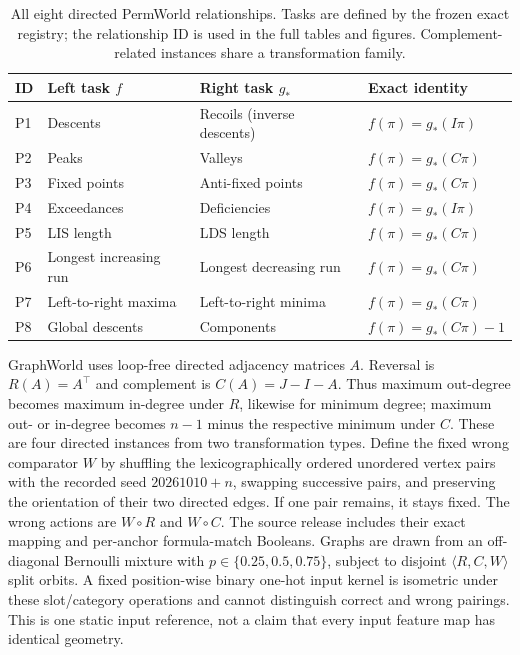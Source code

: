 \documentclass[10pt]{article}
\begin{document}
\begin{table}[h]
\centering\small
\begin{tabular}{llll}
\toprule
ID & Left task $f$ & Right task $g_*$ & Exact identity\\
\midrule
P1 & Descents & Recoils (inverse descents) & $f(\pi)=g_*(I\pi)$\\
P2 & Peaks & Valleys & $f(\pi)=g_*(C\pi)$\\
P3 & Fixed points & Anti-fixed points & $f(\pi)=g_*(C\pi)$\\
P4 & Exceedances & Deficiencies & $f(\pi)=g_*(I\pi)$\\
P5 & LIS length & LDS length & $f(\pi)=g_*(C\pi)$\\
P6 & Longest increasing run & Longest decreasing run & $f(\pi)=g_*(C\pi)$\\
P7 & Left-to-right maxima & Left-to-right minima & $f(\pi)=g_*(C\pi)$\\
P8 & Global descents & Components & $f(\pi)=g_*(C\pi)-1$\\
\bottomrule
\end{tabular}
\caption{All eight directed PermWorld relationships. Tasks are defined by
the frozen exact registry; the relationship ID is used in the full tables
and figures. Complement-related instances share a transformation family.}
\label{tab:relations}
\end{table}

GraphWorld uses loop-free directed adjacency matrices $A$. Reversal is
$R(A)=A^\top$ and complement is $C(A)=J-I-A$. Thus maximum out-degree
becomes maximum in-degree under $R$, likewise for minimum degree; maximum
out- or in-degree becomes $n-1$ minus the respective minimum under $C$.
These are four directed instances from two transformation types. Define the
fixed wrong comparator $W$ by shuffling the lexicographically ordered
unordered vertex pairs with the recorded seed $20261010+n$, swapping
successive pairs, and preserving the orientation of their two directed
edges. If one pair remains, it stays fixed. The wrong actions are $W\circ R$
and $W\circ C$. The source release includes their exact mapping and
per-anchor formula-match Booleans. Graphs are drawn from an off-diagonal
Bernoulli mixture with $p\in\{0.25,0.5,0.75\}$, subject to disjoint
$\langle R,C,W\rangle$ split orbits. A fixed position-wise binary one-hot
input kernel is isometric under these slot/category operations and cannot
distinguish correct and wrong pairings. This is one static input reference,
not a claim that every input feature map has identical geometry.
\end{document}
